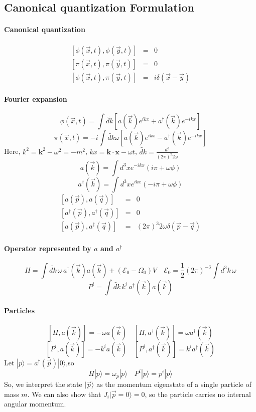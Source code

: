 \documentclass{article}
\begin{document}
\subsection{Canonical quantization Formulation}
\paragraph{Canonical quantization}
\begin{eqnarray}
\left[\phi(\vec{x},t),\phi(\vec{y},t)\right] &=& 0 \nonumber \\
\left[\pi(\vec{x},t),\pi(\vec{y},t)\right] &=& 0 \nonumber \\
\left[\phi(\vec{x},t),\pi(\vec{y},t)\right] &=& i \delta(\vec{x}-\vec{y}) \nonumber
\end{eqnarray}
\paragraph{Fourier expansion}
\[\phi(\vec{x},t) = \int \widetilde{dk} \left[ a(\vec{k})e^{ikx} + a^{\dagger}(\vec{k})e^{-ikx} \right]\]
\[\pi(\vec{x},t) = -i \int  \widetilde{dk} \omega \left[ a(\vec{k})e^{ikx} - a^{\dagger}(\vec{k})e^{-ikx} \right]\]
Here, $k^2 = \mathbf{k}^2 - \omega^2 = -m^2$, $kx = \mathbf{k}\cdot \mathbf{x} - \omega t$, $\widetilde{dk} = \frac{d^3}{(2\pi)^2 2\omega}$
\[a(\vec{k}) = \int d^3 x e^{-ikx}(i\pi+\omega \phi)\]
\[a^{\dagger}(\vec{k}) = \int d^3 x e^{ikx}(-i\pi+\omega \phi)\]
\begin{eqnarray}
\left[a(\vec{p}),a(\vec{q})\right] &=& 0 \nonumber \\
\left[a^{\dagger}(\vec{p}),a^{\dagger}(\vec{q})\right] &=& 0 \nonumber \\
\left[a(\vec{p}),a^{\dagger}(\vec{q})\right] &=& (2\pi)^3 2\omega \delta(\vec{p}-\vec{q}) \nonumber
\end{eqnarray}
\paragraph{Operator represented by $a$ and $a^{\dagger}$}
\[H=\int \widetilde{dk}\, \omega\, a^{\dagger}(\vec{k})a(\vec{k}) + (\mathcal{E}_0 - \Omega_0)V \quad \mathcal{E}_0 = \frac{1}{2}(2\pi)^{-3}\int d^3 k \,\omega\]
\[P^{i}=\int \widetilde{dk}\, k^{i}\, a^{\dagger}(\vec{k})a(\vec{k}) \]
\paragraph{Particles}
\[[H,a(\vec{k})] = -\omega a(\vec{k}) \quad [H,a^{\dagger}(\vec{k})] = \omega a^{\dagger}(\vec{k})\]
\[[P^i,a(\vec{k})] = -k^i a(\vec{k}) \quad [P^i,a^{\dagger}(\vec{k})] = k^i a^{\dagger}(\vec{k})\]
Let $|p\rangle = a^{\dagger}(\vec{p})|0\rangle $,so
\[H |p\rangle = \omega_p|p\rangle \quad P^i |p\rangle = p^i|p\rangle\]
So, we interpret the state $|\vec{p}\rangle$ as the momentum eigenstate of a single particle of mass $m$. We can also show that 
$J_i|\vec{p} = 0\rangle = 0$, so the particle carries no internal angular momentum.
\end{document}
